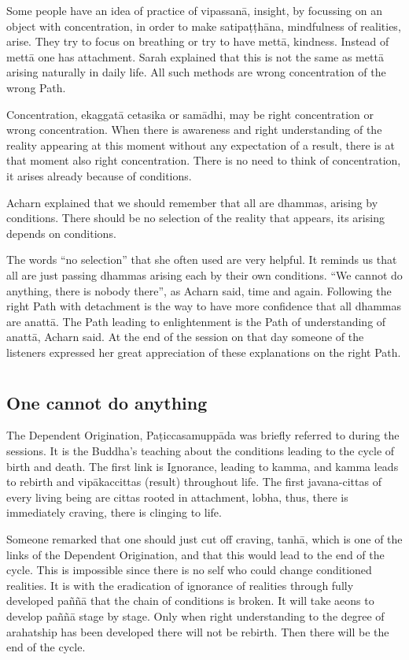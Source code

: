 Some people have an idea of practice of vipassanā, insight, by focussing
on an object with concentration, in order to make satipaṭṭhāna,
mindfulness of realities, arise. They try to focus on breathing or try
to have mettā, kindness. Instead of mettā one has attachment. Sarah
explained that this is not the same as mettā arising naturally in daily
life. All such methods are wrong concentration of the wrong Path.

Concentration, ekaggatā cetasika or samādhi, may be right concentration
or wrong concentration. When there is awareness and right understanding
of the reality appearing at this moment without any expectation of a
result, there is at that moment also right concentration. There is no
need to think of concentration, it arises already because of conditions.

Acharn explained that we should remember that all are dhammas, arising
by conditions. There should be no selection of the reality that appears,
its arising depends on conditions.

The words ``no selection'' that she often used are very helpful. It
reminds us that all are just passing dhammas arising each by their own
conditions. ``We cannot do anything, there is nobody there'', as Acharn
said, time and again. Following the right Path with detachment is the
way to have more confidence that all dhammas are anattā. The Path
leading to enlightenment is the Path of understanding of anattā, Acharn
said. At the end of the session on that day someone of the listeners
expressed her great appreciation of these explanations on the right
Path.

\chapter[One cannot do anything]{}
\section*{One cannot do anything}

The Dependent Origination, Paṭiccasamuppāda was briefly referred to
during the sessions. It is the Buddha's teaching about the conditions
leading to the cycle of birth and death. The first link is Ignorance,
leading to kamma, and kamma leads to rebirth and vipākaccittas (result)
throughout life. The first javana-cittas of every living being are
cittas rooted in attachment, lobha, thus, there is immediately craving,
there is clinging to life.

Someone remarked that one should just cut off craving, tanhā, which is
one of the links of the Dependent Origination, and that this would lead
to the end of the cycle. This is impossible since there is no self who
could change conditioned realities. It is with the eradication of
ignorance of realities through fully developed paññā that the chain of
conditions is broken. It will take aeons to develop paññā stage by
stage. Only when right understanding to the degree of arahatship has
been developed there will not be rebirth. Then there will be the end of
the cycle.

